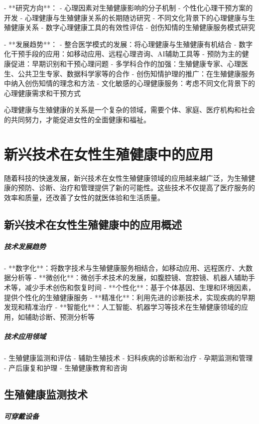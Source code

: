 \begin{enumerate}
- **研究方向**：
  - 心理因素对生殖健康影响的分子机制
  - 个性化心理干预方案的开发
  - 心理健康与生殖健康关系的长期随访研究
  - 不同文化背景下的心理健康与生殖健康关系
  - 数字心理健康工具的有效性评估
  - 创伤知情的生殖健康服务模式研究

- **发展趋势**：
  - 整合医学模式的发展：将心理健康与生殖健康有机结合
  - 数字化干预手段的应用：如移动应用、远程心理咨询、AI辅助工具等
  - 预防为主的健康促进：早期识别和干预心理问题
  - 多学科合作的加强：生殖健康专家、心理医生、公共卫生专家、数据科学家等的合作
  - 创伤知情护理的推广：在生殖健康服务中纳入创伤知情的理念和方法
  - 文化敏感的心理健康服务：考虑不同文化背景下的心理健康需求和干预方式

心理健康与生殖健康的关系是一个复杂的领域，需要个体、家庭、医疗机构和社会的共同努力，才能促进女性的全面健康和福祉。

\section{新兴技术在女性生殖健康中的应用}

随着科技的快速发展，新兴技术在女性生殖健康领域的应用越来越广泛，为生殖健康的预防、诊断、治疗和管理提供了新的可能性。这些技术不仅提高了医疗服务的效率和质量，还改善了女性的就医体验和生活质量。

\subsection{新兴技术在女性生殖健康中的应用概述}

\subparagraph{技术发展趋势}

- **数字化**：将数字技术与生殖健康服务相结合，如移动应用、远程医疗、大数据分析等
- **微创化**：微创手术技术的发展，如腹腔镜、宫腔镜、机器人辅助手术等，减少手术创伤和恢复时间
- **个性化**：基于个体基因、生理和环境因素，提供个性化的生殖健康服务
- **精准化**：利用先进的诊断技术，实现疾病的早期发现和精准治疗
- **智能化**：人工智能、机器学习等技术在生殖健康领域的应用，如辅助诊断、预测分析等

\subparagraph{技术应用领域}

- 生殖健康监测和评估
- 辅助生殖技术
- 妇科疾病的诊断和治疗
- 孕期监测和管理
- 产后康复和护理
- 生殖健康教育和咨询

\subsection{生殖健康监测技术}

\subparagraph{可穿戴设备}


\end{enumerate}
